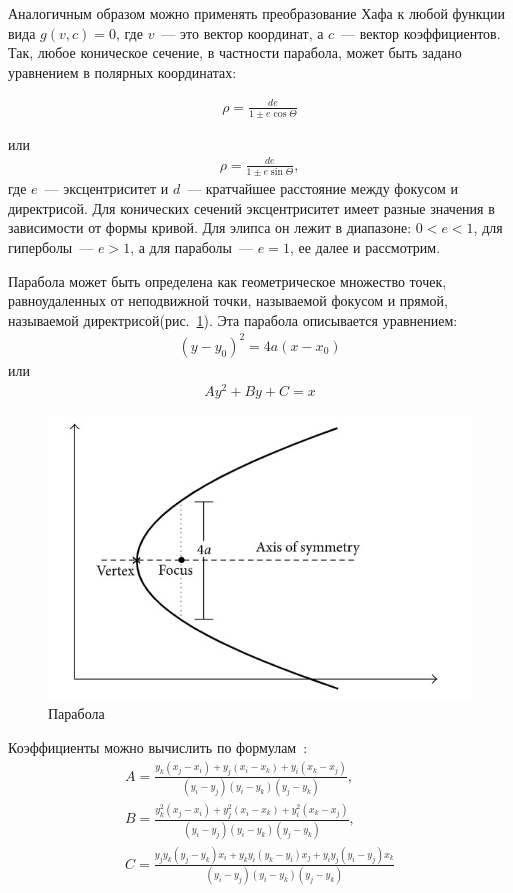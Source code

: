 \documentclass[12pt,a4paper]{article} %
\begin{document}
Аналогичным образом можно применять преобразование Хафа к любой функции вида $g(v,c) = 0$, где $v$~--- это вектор координат, а $c$~--- вектор коэффициентов.
Так, любое коническое сечение, в частности парабола, может быть задано уравнением в полярных координатах:

\begin{gather}\label{conic}
	\rho = \frac{de}{1\pm e\cos{\Theta}}
\end{gather}

или
\begin{gather}\label{conic2}
	\rho = \frac{de}{1\pm e\sin{\Theta}},
\end{gather}
где $e$~--- эксцентриситет и $d$~--- кратчайшее расстояние между фокусом и директрисой. Для конических сечений эксцентриситет имеет разные значения в зависимости от формы кривой. Для элипса он лежит в диапазоне: $0<e<1$, для гиперболы~--- $e>1$, а для параболы~--- $e = 1$, ее далее и рассмотрим.

Парабола может быть определена как геометрическое множество точек, равноудаленных от неподвижной точки, называемой фокусом и прямой, называемой директрисой(рис.~\ref{fig:hough_parab}). Эта парабола описывается уравнением:
\begin{gather}\label{parab_equ}
	(y-y_0)^2 = 4a(x-x_0)
\end{gather}
 или
 \begin{gather}\label{parab_equ_2}
 	Ay^2+By+C=x
 \end{gather}
\begin{figure}[h]
	
	\centering
	
	\includegraphics[width=0.6\linewidth]{hough_parab.jpg}
	
	\caption{Парабола}
	
	\label{fig:hough_parab}
	
\end{figure}

Коэффициенты можно вычислить по формулам~\cite{Hough_Parab}: 
 \begin{gather}\label{parab_equ_3}
	A=\frac{y_k(x_j-x_i)+y_j(x_i-x_k)+y_i(x_k-x_j)}{(y_i-y_j)(y_i-y_k)(y_j-y_k)},\\
	B=\frac{y_k^2(x_j-x_i)+y_j^2(x_i-x_k)+y_i^2(x_k-x_j)}{(y_i-y_j)(y_i-y_k)(y_j-y_k)},\\
	C= \frac{y_jy_k(y_j-y_k)x_i+y_ky_i(y_k-y_i)x_j+y_iy_j(y_i-y_j)x_k}{(y_i-y_j)(y_i-y_k)(y_j-y_k)}
\end{gather}
\end{document}
